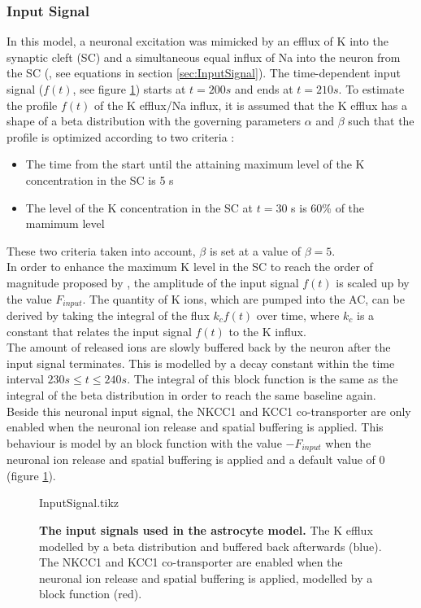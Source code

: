 \subsubsection{Input Signal}
In this model, a neuronal excitation was mimicked by an efflux of \gls{K} into the synaptic cleft (SC) and a simultaneous equal influx of \gls{Na} into the neuron from the SC (\citet{Ostby2009}, see equations in section \ref{sec:InputSignal}). The time-dependent input signal ($f(t)$, see figure \ref{fig:InputSignal}) starts at $t=200 s$ and ends at $t=210 s$. To estimate the profile $f(t)$ of the \gls{K} efflux/\gls{Na} influx, it is assumed that the \gls{K} efflux has a shape of a beta distribution with the governing parameters $\alpha$ and $\beta$ such that the profile is optimized according to two criteria \cite{Ostby2009}:\\
%
\begin{itemize}
\item [1.] The time from the start until the attaining maximum level of the \gls{K} concentration in the SC is 5 s
\item [2.] The level of the \gls{K} concentration in the SC at $ t = 30 $ s is 60\% of the mamimum level
\end{itemize}
%
These two criteria taken into account, $\beta$ is set at a value of $\beta = 5$.\\
In order to enhance the maximum \gls{K} level in the SC to reach the order of magnitude proposed by \citet{Filosa2004}, the amplitude of the input signal $f(t)$ is scaled up by the value $F_{input}$. The quantity of \gls{K} ions, which are pumped into the AC, can be derived by taking the integral of the flux $k_c f(t)$ over time, where $k_c$ is a constant that relates the input signal $f(t)$ to the \gls{K} influx. \\
The amount of released  ions are slowly buffered back by the neuron after the input signal terminates. This is modelled by a decay constant within the time interval $ 230 s \leq t \leq 240 s$. The integral of this block function is the same as the integral of the beta distribution in order to reach the same baseline again.\\
Beside this neuronal input signal, the NKCC1 and KCC1 co-transporter are only enabled when the neuronal ion release and spatial buffering is applied. This behaviour is model by an block function with the value $-F_{input}$ when the neuronal ion release and spatial buffering is applied and a default value of 0 (figure \ref{fig:InputSignal}). \\
%
%
\begin{figure}[h!]
	\centering
	\footnotesize %
	\newlength\figureheight 
	\newlength\figurewidth 
	\setlength\figureheight{6cm} 
	\setlength\figurewidth{10 cm}
	{InputSignal.tikz}
	\caption{\textbf{The input signals used in the astrocyte model.} The \gls{K} efflux modelled by a beta distribution and buffered back afterwards (blue). The NKCC1 and KCC1 co-transporter are enabled when the neuronal ion release and spatial buffering is applied, modelled by a block function (red).  }
	\label{fig:InputSignal}
\end{figure}
% 
%
